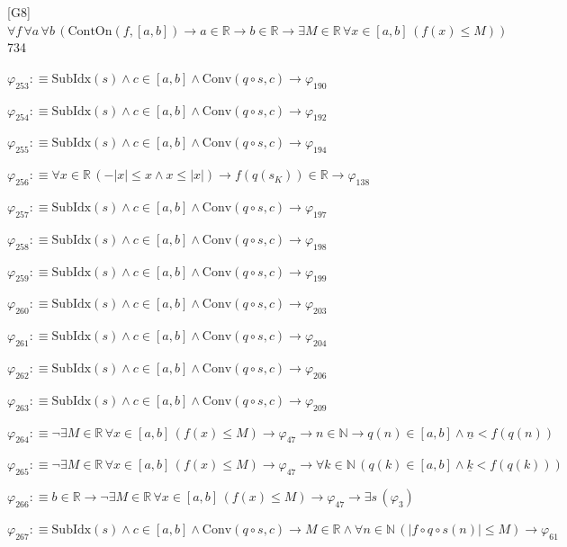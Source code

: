 \begin{fullproof}{[G8]}{$\forall f\,\forall a\,\forall b\,(\mathrm{ContOn}(f,[a,b]) \to a \in \mathbb{R} \to b \in \mathbb{R} \to \exists M \in \mathbb{R}\,\forall x \in [a,b]\,(f(x) \leq M))$}{734}
\begin{abbrevlist}
\item $\varphi_{253} :\equiv \mathrm{SubIdx}(s) \land c \in [a,b] \land \mathrm{Conv}(q \circ s,c) \to \varphi_{190}$
\item $\varphi_{254} :\equiv \mathrm{SubIdx}(s) \land c \in [a,b] \land \mathrm{Conv}(q \circ s,c) \to \varphi_{192}$
\item $\varphi_{255} :\equiv \mathrm{SubIdx}(s) \land c \in [a,b] \land \mathrm{Conv}(q \circ s,c) \to \varphi_{194}$
\item $\varphi_{256} :\equiv \forall x \in \mathbb{R}\,(-\lvert x \rvert \leq x \land x \leq \lvert x \rvert) \to f(q(s_{K})) \in \mathbb{R} \to \varphi_{138}$
\item $\varphi_{257} :\equiv \mathrm{SubIdx}(s) \land c \in [a,b] \land \mathrm{Conv}(q \circ s,c) \to \varphi_{197}$
\item $\varphi_{258} :\equiv \mathrm{SubIdx}(s) \land c \in [a,b] \land \mathrm{Conv}(q \circ s,c) \to \varphi_{198}$
\item $\varphi_{259} :\equiv \mathrm{SubIdx}(s) \land c \in [a,b] \land \mathrm{Conv}(q \circ s,c) \to \varphi_{199}$
\item $\varphi_{260} :\equiv \mathrm{SubIdx}(s) \land c \in [a,b] \land \mathrm{Conv}(q \circ s,c) \to \varphi_{203}$
\item $\varphi_{261} :\equiv \mathrm{SubIdx}(s) \land c \in [a,b] \land \mathrm{Conv}(q \circ s,c) \to \varphi_{204}$
\item $\varphi_{262} :\equiv \mathrm{SubIdx}(s) \land c \in [a,b] \land \mathrm{Conv}(q \circ s,c) \to \varphi_{206}$
\item $\varphi_{263} :\equiv \mathrm{SubIdx}(s) \land c \in [a,b] \land \mathrm{Conv}(q \circ s,c) \to \varphi_{209}$
\item $\varphi_{264} :\equiv \neg \exists M \in \mathbb{R}\,\forall x \in [a,b]\,(f(x) \leq M) \to \varphi_{47} \to n \in \mathbb{N} \to q(n) \in [a,b] \land \underline{n} < f(q(n))$
\item $\varphi_{265} :\equiv \neg \exists M \in \mathbb{R}\,\forall x \in [a,b]\,(f(x) \leq M) \to \varphi_{47} \to \forall k \in \mathbb{N}\,(q(k) \in [a,b] \land \underline{k} < f(q(k)))$
\item $\varphi_{266} :\equiv b \in \mathbb{R} \to \neg \exists M \in \mathbb{R}\,\forall x \in [a,b]\,(f(x) \leq M) \to \varphi_{47} \to \exists s\,(\varphi_{3})$
\item $\varphi_{267} :\equiv \mathrm{SubIdx}(s) \land c \in [a,b] \land \mathrm{Conv}(q \circ s,c) \to M \in \mathbb{R} \land \forall n \in \mathbb{N}\,(\lvert f \circ q \circ s(n) \rvert \leq M) \to \varphi_{61}$

\end{abbrevlist}
\end{fullproof}
